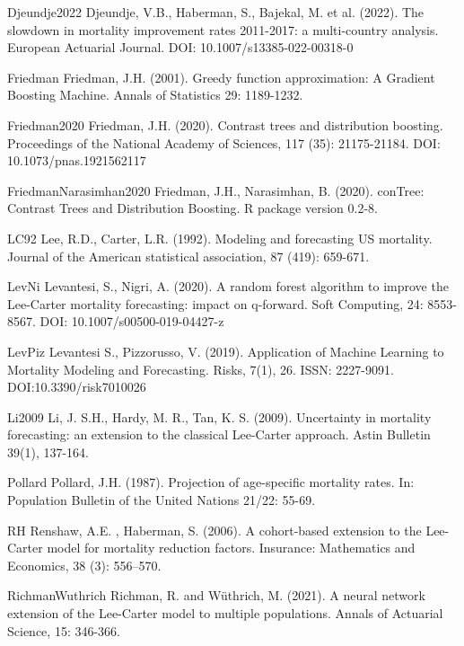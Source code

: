 \documentclass[fleqn,10pt]{wlscirep}
\begin{document}
\begin{thebibliography}{99}
\bibitem%
{Djeundje2022} 
Djeundje, V.B., Haberman, S., Bajekal, M. et al. (2022). The slowdown in mortality improvement rates 2011-2017: a multi-country analysis. European Actuarial Journal. DOI: 10.1007/s13385-022-00318-0

\bibitem%
{Friedman} 
Friedman, J.H. (2001). Greedy function approximation: A Gradient Boosting Machine. Annals of Statistics 29: 1189-1232.

\bibitem%
{Friedman2020}
Friedman, J.H. (2020). Contrast trees and distribution boosting. Proceedings of the National Academy of Sciences, 117 (35): 21175-21184. DOI: 10.1073/pnas.1921562117

\bibitem%
{FriedmanNarasimhan2020}
Friedman, J.H., Narasimhan, B. (2020). conTree: Contrast Trees and Distribution Boosting. R package version 0.2-8.

\bibitem%
{LC92}
Lee, R.D., Carter, L.R. (1992). Modeling and forecasting US mortality. Journal of the American statistical association, 87 (419): 659-671.

\bibitem%
{LevNi}
Levantesi, S., Nigri, A. (2020). A random forest algorithm to improve the Lee-Carter mortality forecasting: impact on q-forward. Soft Computing, 24: 8553-8567. DOI: 10.1007/s00500-019-04427-z

\bibitem%
{LevPiz}
Levantesi S., Pizzorusso, V. (2019). Application of Machine Learning to Mortality Modeling and Forecasting. Risks, 7(1), 26. ISSN: 2227-9091. DOI:10.3390/risk7010026

\bibitem%
{Li2009}
Li, J. S.H.,  Hardy, M. R., Tan, K. S. (2009). Uncertainty in mortality forecasting: an extension to the classical Lee-Carter approach. Astin Bulletin 39(1), 137-164.

\bibitem%
{Pollard}
Pollard, J.H. (1987). Projection of age-specific mortality rates. In: Population Bulletin of the United Nations 21/22: 55-69.

\bibitem%
{RH}
Renshaw, A.E. , Haberman, S. (2006). A cohort-based extension to the Lee-Carter model for mortality reduction factors. Insurance: Mathematics and Economics, 38 (3): 556–570.

\bibitem%
{RichmanWuthrich}
Richman, R. and W\"uthrich, M. (2021). A neural network extension of the Lee-Carter model to multiple populations. Annals of Actuarial Science, 15: 346-366.


\end{thebibliography}
\end{document}
